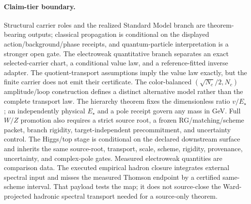\paragraph{Claim-tier boundary.}
Structural carrier roles and the realized Standard Model branch are theorem-bearing outputs;
classical propagation is conditional on the displayed action/background/phase receipts, and
quantum-particle interpretation is a stronger open gate.
The electroweak quantitative branch separates an exact selected-carrier chart, a conditional value
law, and a reference-fitted inverse adapter. The quotient-transport assumptions imply the value law
exactly, but the finite carrier does not emit their certificate. The color-balanced
\((\sqrt{N_c}/2,N_c)\) amplitude/loop construction defines a distinct alternative model rather
than the complete transport law. The hierarchy theorem fixes the dimensionless
ratio \(v/E_\star\); an independently physical \(E_\star\) and a pole receipt govern any mass in
GeV. Full \(W/Z\) promotion also requires a strict source root, a frozen
RG/matching/scheme packet, branch rigidity, target-independent precommitment, and uncertainty control. The
Higgs/top stage is conditional on the declared downstream surface and inherits the same
source-root, transport, scale, scheme, rigidity, provenance, uncertainty, and complex-pole gates.
Measured electroweak quantities are comparison data. The executed empirical hadron closure
integrates external spectral input and misses the measured Thomson endpoint by a certified
same-scheme interval. That payload tests the map; it does not source-close the Ward-projected
hadronic spectral transport needed for a source-only theorem.


